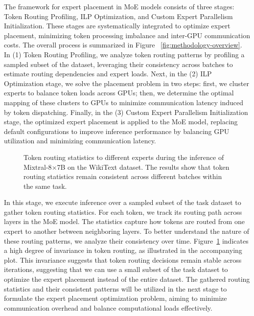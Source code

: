 The framework for expert placement in MoE models consists of three stages: Token Routing Profiling, ILP Optimization, and Custom Expert Parallelism Initialization. 
%
These stages are systematically integrated to optimize expert placement, minimizing token processing imbalance and inter-GPU communication costs. 
%
The overall process is summarized in Figure ~\ref{fig:methodology-overview}.
In (1) Token Routing Profiling, we analyze token routing patterns by profiling a sampled subset of the dataset, leveraging their consistency across batches to estimate routing dependencies and expert loads. 
%
Next, in the (2) ILP Optimization stage, we solve the placement problem in two steps: first, we cluster experts to balance token loads across GPUs; then, we determine the optimal mapping of these clusters to GPUs to minimize communication latency induced by token dispatching.
%
Finally, in the (3) Custom Expert Parallelism Initialization stage, the optimized expert placement is applied to the MoE model, replacing default configurations to improve inference performance by balancing GPU utilization and minimizing communication latency.


\begin{figure}
    \centering
    
    \vspace{-1em}
    \caption{Token routing statistics to different experts during the inference of Mixtral-8$\times$7B on the WikiText dataset. The results show that token routing statistics remain consistent across different batches within the same task.}
    \label{fig:routing-invariance}
    \vspace{-2ex}
\end{figure}

%
In this stage, we execute inference over a sampled subset of the task dataset to gather token routing statistics. For each token, we track its routing path across layers in the MoE model. The statistics capture how tokens are routed from one expert to another between neighboring layers.
%
To better understand the nature of these routing patterns, we analyze their consistency over time. Figure~\ref{fig:routing-invariance} indicates a high degree of invariance in token routing, as illustrated in the accompanying plot. 
%
This invariance suggests that token routing decisions remain stable across iterations, suggesting that we can use a small subset of the task dataset to optimize the expert placement instead of the entire dataset.
%
The gathered routing statistics and their consistent patterns will be utilized in the next stage to formulate the expert placement optimization problem, aiming to minimize communication overhead and balance computational loads effectively.



